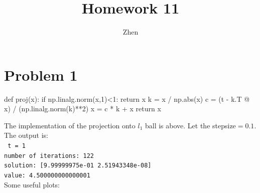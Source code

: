 \documentclass{article}
\begin{document}
\title{Homework 11}
\author{Zhen}
\maketitle

\section*{Problem 1}
\begin{python}
def proj(x):
	if np.linalg.norm(x,1)<1:
		return x
	k = x / np.abs(x)
	c = (t - k.T @ x) / (np.linalg.norm(k)**2)
	x = c * k + x
	return x
\end{python}
The implementation of the projection onto $l_1$ ball is above. Let the stepsize$=0.1$. The output is:
\\
\texttt{
t =  1\\
number of iterations: 122\\
solution: [9.99999975e-01 2.51943348e-08]\\
value: 4.500000000000001
}
\\
Some useful plots:
\end{document}
